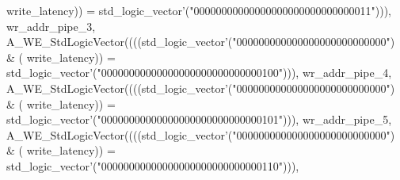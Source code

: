 \begin{DoxyCode}
{      write_latency}\textcolor{vhdlchar}{)}\textcolor{vhdlchar}{)} \textcolor{vhdlchar}{=} \textcolor{comment}{std\_logic\_vector}\textcolor{vhdlchar}{'}\textcolor{vhdlchar}{(}\textcolor{vhdllogic}{"00000000000000000000000000000011"}\textcolor{vhdlchar}{)}\textcolor{vhdlchar}{)}\textcolor{vhdlchar}{)}\textcolor{vhdlchar}{,} \textcolor{vhdlchar}{
      wr_addr_pipe_3}\textcolor{vhdlchar}{,} \textcolor{vhdlchar}{A\_WE\_StdLogicVector}\textcolor{vhdlchar}{(}\textcolor{vhdlchar}{(}\textcolor{vhdlchar}{(}\textcolor{vhdlchar}{(}\textcolor{comment}{std\_logic\_vector}\textcolor{vhdlchar}{'}\textcolor{vhdlchar}{(}\textcolor{vhdllogic}{"000000000000000000000000000"}\textcolor{vhdlchar}{)} \textcolor{vhdlchar}{&} \textcolor{vhdlchar}{(}\textcolor{vhdlchar}{
      write_latency}\textcolor{vhdlchar}{)}\textcolor{vhdlchar}{)} \textcolor{vhdlchar}{=} \textcolor{comment}{std\_logic\_vector}\textcolor{vhdlchar}{'}\textcolor{vhdlchar}{(}\textcolor{vhdllogic}{"00000000000000000000000000000100"}\textcolor{vhdlchar}{)}\textcolor{vhdlchar}{)}\textcolor{vhdlchar}{)}\textcolor{vhdlchar}{,} \textcolor{vhdlchar}{
      wr_addr_pipe_4}\textcolor{vhdlchar}{,} \textcolor{vhdlchar}{A\_WE\_StdLogicVector}\textcolor{vhdlchar}{(}\textcolor{vhdlchar}{(}\textcolor{vhdlchar}{(}\textcolor{vhdlchar}{(}\textcolor{comment}{std\_logic\_vector}\textcolor{vhdlchar}{'}\textcolor{vhdlchar}{(}\textcolor{vhdllogic}{"000000000000000000000000000"}\textcolor{vhdlchar}{)} \textcolor{vhdlchar}{&} \textcolor{vhdlchar}{(}\textcolor{vhdlchar}{
      write_latency}\textcolor{vhdlchar}{)}\textcolor{vhdlchar}{)} \textcolor{vhdlchar}{=} \textcolor{comment}{std\_logic\_vector}\textcolor{vhdlchar}{'}\textcolor{vhdlchar}{(}\textcolor{vhdllogic}{"00000000000000000000000000000101"}\textcolor{vhdlchar}{)}\textcolor{vhdlchar}{)}\textcolor{vhdlchar}{)}\textcolor{vhdlchar}{,} \textcolor{vhdlchar}{
      wr_addr_pipe_5}\textcolor{vhdlchar}{,} \textcolor{vhdlchar}{A\_WE\_StdLogicVector}\textcolor{vhdlchar}{(}\textcolor{vhdlchar}{(}\textcolor{vhdlchar}{(}\textcolor{vhdlchar}{(}\textcolor{comment}{std\_logic\_vector}\textcolor{vhdlchar}{'}\textcolor{vhdlchar}{(}\textcolor{vhdllogic}{"000000000000000000000000000"}\textcolor{vhdlchar}{)} \textcolor{vhdlchar}{&} \textcolor{vhdlchar}{(}\textcolor{vhdlchar}{
      write_latency}\textcolor{vhdlchar}{)}\textcolor{vhdlchar}{)} \textcolor{vhdlchar}{=} \textcolor{comment}{std\_logic\_vector}\textcolor{vhdlchar}{'}\textcolor{vhdlchar}{(}\textcolor{vhdllogic}{"00000000000000000000000000000110"}\textcolor{vhdlchar}{)}\textcolor{vhdlchar}{)}\textcolor{vhdlchar}{)}\textcolor{vhdlchar}{,} \textcolor{vhdlchar}{
}
\end{DoxyCode}
